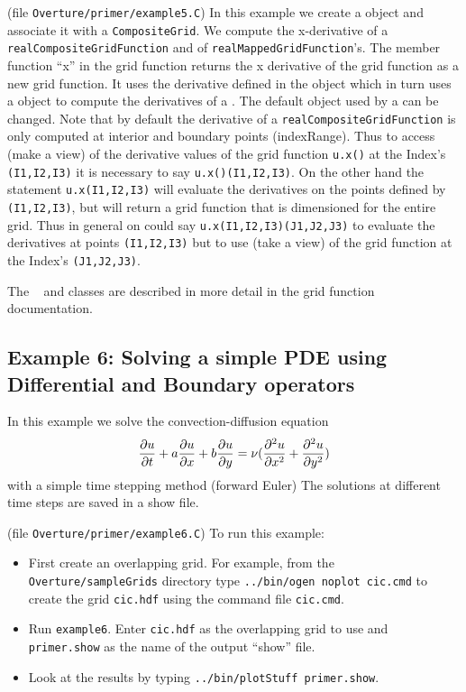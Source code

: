 \documentclass{article}
\begin{document}
(file {\tt Overture/primer/example5.C})
{\footnotesize
{}
}
In this example we create a {\tt \CGO} object and associate
it with a {\tt CompositeGrid}. We compute the x-derivative of
a {\tt realCompositeGridFunction} and of 
{\tt realMappedGridFunction}'s.
The member
function ``x'' in the grid function returns the
x derivative of the grid function as a new grid function. 
It uses the derivative
defined in the {\tt \CGO} object which in turn uses a {\tt \MGO} object
to compute the derivatives of a {\MGF}. The default {\tt \MGO} object
used by a {\tt \CGO} can be changed.
Note that by default the derivative of a {\tt realCompositeGridFunction} 
is only computed at interior and boundary points (indexRange). Thus to
access (make a view) of the derivative values of the grid function {\tt u.x()} 
at the Index's {\tt (I1,I2,I3)}
it is necessary to say {\tt u.x()(I1,I2,I3)}. On the other hand the statement
{\tt u.x(I1,I2,I3)} will evaluate the derivatives on the points
defined by {\tt (I1,I2,I3)}, but will return a grid function that is dimensioned
for the entire grid. Thus in general on could say {\tt u.x(I1,I2,I3)(J1,J2,J3)}
to evaluate the derivatives at points {\tt (I1,I2,I3)} but to use (take a view)
of the grid function at the Index's {\tt (J1,J2,J3)}. 

The {\tt \MGO~} and {\tt \CGO} classes are described in more detail in the
grid function documentation.



\vfill\eject
\subsection{Example 6: Solving a simple PDE using Differential and Boundary operators}

In this example we solve the convection-diffusion equation
\[
   {\partial u \over \partial t} 
 + a {\partial u \over \partial x} 
 + b {\partial u \over \partial y} 
 = \nu ( {\partial^2 u \over \partial x^2} 
        + {\partial^2 u \over \partial y^2}  )
\]
with a simple time stepping method (forward Euler)
The solutions at different time steps are saved in a show
file. 

(file {\tt Overture/primer/example6.C})
{\footnotesize
{}
}
To run this example:
\begin{itemize}
  \item First create an overlapping grid. For example, from the {\tt Overture/sampleGrids} directory
     type {\tt ../bin/ogen noplot cic.cmd} to create the grid {\tt cic.hdf} using
      the command file {\tt cic.cmd}.
  \item Run {\tt example6}. Enter {\tt cic.hdf} as the overlapping grid to use
     and {\tt primer.show} as the name of the output ``show'' file.
  \item Look at the results by typing {\tt ../bin/plotStuff primer.show}.
\end{itemize}
\end{document}
